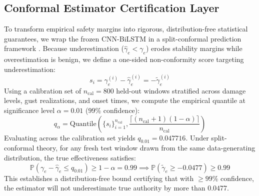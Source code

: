 \documentclass[review,12pt]{elsarticle}
\begin{document}
\subsection{Conformal Estimator Certification Layer}
\label{sec:conformal}

To transform empirical safety margins into rigorous, distribution-free statistical guarantees, we wrap the frozen CNN-BiLSTM in a split-conformal prediction framework \cite{Vovk2005, Tibshirani2019, Angelopoulos2023}. Because underestimation ($\hat{\gamma}_e < \gamma_e$) erodes stability margins while overestimation is benign, we define a one-sided non-conformity score targeting underestimation:
\begin{equation}
    s_i = \gamma_e^{(i)} - \hat{\gamma}_e^{(i)} = -\tilde{\gamma}_e^{(i)}
\end{equation}
Using a calibration set of $n_{\text{cal}} = 800$ held-out windows stratified across damage levels, gust realizations, and onset times, we compute the empirical quantile at significance level $\alpha = 0.01$ ($99\%$ confidence):
\begin{equation}
    q_{\alpha} = \text{Quantile}\left( \{s_i\}_{i=1}^{n_{\text{cal}}}, \frac{\lceil (n_{\text{cal}} + 1)(1 - \alpha) \rceil}{n_{\text{cal}}} \right)
\end{equation}
Evaluating across the calibration set yields $q_{0.01} = 0.047716$. Under split-conformal theory, for any fresh test window drawn from the same data-generating distribution, the true effectiveness satisfies:
\begin{equation}
    \mathbb{P}\left( \gamma_e - \hat{\gamma}_e \le q_{0.01} \right) \ge 1 - \alpha = 0.99 \implies \mathbb{P}\left( \tilde{\gamma}_e \ge -0.0477 \right) \ge 0.99
\end{equation}
This establishes a distribution-free bound certifying that with $\ge 99\%$ confidence, the estimator will not underestimate true authority by more than $0.0477$.
\end{document}
